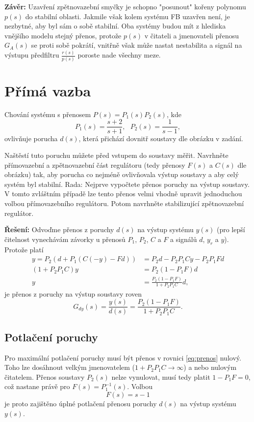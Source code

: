 \documentclass[twoside]{article}
\begin{document}
\textbf{Závěr:} Uzavření zpětnovazební smyčky je schopno "posunout" kořeny polynomu $p(s)$
do stabilní oblasti. Jakmile však kolem systému FB uzavřen není, je nezbytné, aby byl sám o sobě stabilní.
Oba systémy budou mít z hlediska vnějšího modelu stejný přenos, protože $p(s)$ v čitateli a jmenovateli přenosu $G_A(s)$
se proti sobě pokrátí, vnitřně však může nastat nestabilita a signál na výstupu předfiltru $\frac{r(s)}{p(s)}$ poroste nade všechny meze.

\section{Přímá vazba}
Chování systému s přenosem $P(s) = P_1(s) P_2(s)$, kde
\begin{equation}
	P_1(s) = \frac{s+2}{s+1}, ~~~ P_2(s) = \frac{1}{s-1},
\end{equation}
ovlivňuje porucha $d(s)$, která přichází dovnitř soustavy dle obrázku v zadání.

Naštěstí tuto poruchu můžete před vstupem do soustavy měřit. Navrhněte přímovazební a
zpětnovazební část regulátoru (tedy přenosy $F(s)$ a $C(s)$ dle obrázku) tak, aby porucha co nejméně
ovlivňovala výstup soustavy a aby celý systém byl stabilní.
Rada: Nejprve vypočtete přenos poruchy na výstup soustavy. V tomto zvláštním případě lze tento přenos
velmi vhodně upravit jednoduchou volbou přímovazebního regulátoru. Potom navrhněte stabilizující
zpětnovazební regulátor. 

\textbf{Řešení:}
Odvoďme přenos z poruchy $d(s)$ na výstup systému $y(s)$ (pro lepší čitelnost vynechávám závorky u přenosů $P_1$, $P_2$, $C$ a $F$
a signálů $d$, $y_r$ a $y$). Protože platí
\begin{equation}
	\begin{split}
		y = P_2 (d + P_1(C (-y) - F d)) &= P_2 d - P_2 P_1 C y - P_2 P_1 F d\\
		(1 + P_2 P_1 C)y &= P_2(1-P_1 F) d \\
		y &= \frac{P_2(1-P_1 F)}{1 + P_2 P_1 C} d,
	\end{split}
\end{equation}
je přenos z poruchy na výstup soustavy roven
\begin{equation}
	G_{dy}(s) = \frac{y(s)}{d(s)} = \frac{P_2(1-P_1 F)}{1 + P_2 P_1 C}.
	\label{eq:prenos}
\end{equation}

\subsection{Potlačení poruchy}
Pro maximální potlačení poruchy musí být přenos v rovnici \eqref{eq:prenos} nulový. Toho lze dosáhnout velkým jmenovatelem
($1 + P_2 P_1 C \rightarrow \infty$) a nebo nulovým čitatelem. Přenos soustavy $P_2(s)$ nelze vynulovat, musí tedy platit $ 1 - P_1 F = 0$,
což nastane právě pro $F(s) = P_1^{-1} (s)$. Volbou
\begin{equation}
	F(s) = s - 1
\end{equation}
je proto zajištěno úplné potlačení přenosu poruchy $d(s)$ na výstup systému $y(s)$.
\end{document}

